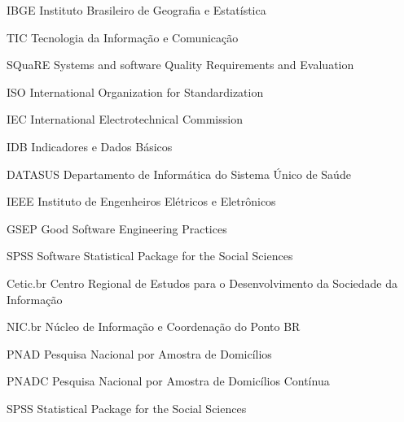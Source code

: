 \begin{siglas}
  \item[IBGE] Instituto Brasileiro de Geografia e Estatística
  \item[TIC] Tecnologia da Informação e Comunicação
  \item[SQuaRE] Systems and software Quality Requirements and Evaluation
  \item [ISO] International Organization for Standardization
  \item [IEC] International Electrotechnical Commission
  \item [IDB] Indicadores e Dados Básicos
  \item [DATASUS] Departamento de Informática do Sistema Único de Saúde
  \item [IEEE] Instituto de Engenheiros Elétricos e Eletrônicos
  \item [GSEP] Good Software Engineering Practices
  \item [SPSS] Software Statistical Package for the Social Sciences
  \item [Cetic.br] Centro Regional de Estudos para o Desenvolvimento da Sociedade da Informação
  \item [NIC.br] Núcleo de Informação e Coordenação do Ponto BR
  \item [PNAD] Pesquisa Nacional por Amostra de Domicílios
  \item [PNADC] Pesquisa Nacional por Amostra de Domicílios Contínua 
  \item [SPSS] Statistical Package for the Social Sciences 
\end{siglas}
